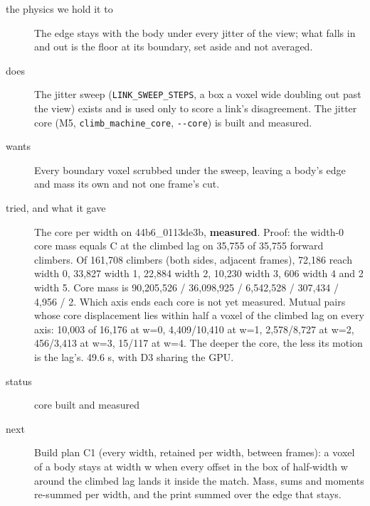\begin{description}
\item[{the physics we hold it to}] The edge stays with the body under every jitter of the view; what falls in and out is the floor at its boundary, set aside and not averaged.
\item[{does}] The jitter sweep (\texttt{LINK\_\allowbreak{}SWEEP\_\allowbreak{}STEPS}, a box a voxel wide doubling out past the view) exists and is used only to score a link's disagreement. The jitter core (M5, \texttt{climb\_\allowbreak{}machine\_\allowbreak{}core}, \texttt{-\allowbreak{}-\allowbreak{}core}) is built and measured.
\item[{wants}] Every boundary voxel scrubbed under the sweep, leaving a body's edge and mass its own and not one frame's cut.
\item[{tried, and what it gave}] The core per width on 44b6\_\allowbreak{}0113de3b, \textbf{measured}. Proof: the width-0 core mass equals C at the climbed lag on 35,755 of 35,755 forward climbers. Of 161,708 climbers (both sides, adjacent frames), 72,186 reach width 0, 33,827 width 1, 22,884 width 2, 10,230 width 3, 606 width 4 and 2 width 5. Core mass is 90,205,526 / 36,098,925 / 6,542,528 / 307,434 / 4,956 / 2. Which axis ends each core is not yet measured. Mutual pairs whose core displacement lies within half a voxel of the climbed lag on every axis: 10,003 of 16,176 at w=0, 4,409/10,410 at w=1, 2,578/8,727 at w=2, 456/3,413 at w=3, 15/117 at w=4. The deeper the core, the less its motion is the lag's. 49.6 s, with D3 sharing the GPU.
\item[{status}] core built and measured
\item[{next}] Build plan C1 (every width, retained per width, between frames): a voxel of a body stays at width w when every offset in the box of half-width w around the climbed lag lands it inside the match. Mass, sums and moments re-summed per width, and the print summed over the edge that stays.
\end{description}

